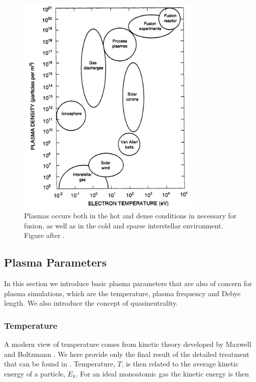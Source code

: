 	\begin{figure}
		\label{fig:plasma_density}
		\begin{center}
			\includegraphics[width = 0.8\textwidth]{figures/theory/plasma/plasma_density}
		\end{center}
		\caption{Plasmas occurs both in the hot and dense conditions in necessary for fusion, as
		well as in the cold and sparse interstellar environment. Figure after \citet{goldston_introduction_1995}.
		}
	\end{figure}



    \subsection{Plasma Parameters}
		In this section we introduce basic plasma parameters that are also of concern for plasma simulations, which
		are the temperature, plasma frequency and Debye length. We also introduce the concept of quasineutrality.
		\label{sec:parameters}
		\subsubsection{Temperature}
		A modern view of temperature comes from kinetic theory developed by
		Maxwell and Boltzmann \citep{swendsen_statistical_2006}. We here provide only the final result
		of the detailed treatment that can be found in \citet{goldston_introduction_1995}.
		Temperature, \(T\), is then related to the average kinetic energy of a particle, \(E_k\).
		For an ideal monoatomic gas the kinetic energy is then

